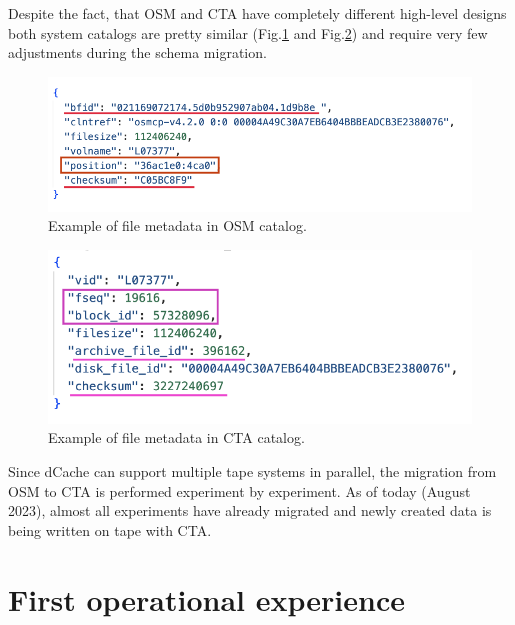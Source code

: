 \documentclass{webofc}
\begin{document}
Despite the fact, that OSM and CTA have completely different high-level designs both system catalogs are pretty similar (Fig.\ref{fig:osm_entry_example} and Fig.\ref{fig:cta_entry_example}) and require very few adjustments during the schema migration.

\begin{figure}[h]
    \centering
    \includegraphics[scale=0.60]{osm-schema.png}
    \caption{Example of file metadata in OSM catalog.}
    \label{fig:osm_entry_example}
\end{figure}

\begin{figure}[h]
    \centering
    \includegraphics[scale=0.60]{cta-schema.png}
    \caption{Example of file metadata in CTA catalog.}
    \label{fig:cta_entry_example}
\end{figure}

Since dCache can support multiple tape systems in parallel, the migration from OSM to CTA is performed experiment by experiment. As of today (August 2023), almost all experiments have already migrated and newly created data is being written on tape with CTA.

\section{First operational experience}
\label{experence}
\end{document}
